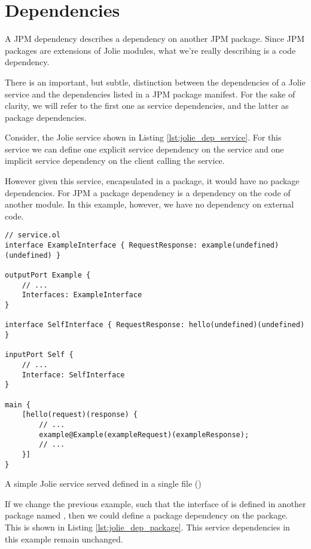 \section{Dependencies}

A JPM dependency describes a dependency on another JPM package. Since JPM
packages are extensions of Jolie modules, what we're really describing is a
code dependency.

There is an important, but subtle, distinction between the dependencies of a
Jolie service and the dependencies listed in a JPM package manifest. For the
sake of clarity, we will refer to the first one as service dependencies, and
the latter as package dependencies.

Consider, the Jolie service shown in Listing \ref{lst:jolie_dep_service}.  For
this service we can define one explicit service dependency on the
 service and one implicit service dependency on the client
calling the  service.

However given this service, encapsulated in a package, it would have no package
dependencies. For JPM a package dependency is a dependency on the code of
another module. In this example, however, we have no dependency on external
code.

\begin{listing}[H]
\begin{verbatim}
// service.ol
interface ExampleInterface { RequestResponse: example(undefined)(undefined) }

outputPort Example {
    // ...
    Interfaces: ExampleInterface
}

interface SelfInterface { RequestResponse: hello(undefined)(undefined) }

inputPort Self {
    // ...
    Interface: SelfInterface
}

main {
    [hello(request)(response) {
        // ...
        example@Example(exampleRequest)(exampleResponse);
        // ...
    }]
}
\end{verbatim}
\caption{A simple Jolie service served defined in a single file
    ()}
\label{lst:jolie_dep_service}
\end{listing}

If we change the previous example, such that the interface of  is
defined in another package named , then we could define a
package dependency on the  package. This is shown in Listing
\ref{lst:jolie_dep_package}. This service dependencies in this example remain
unchanged.

